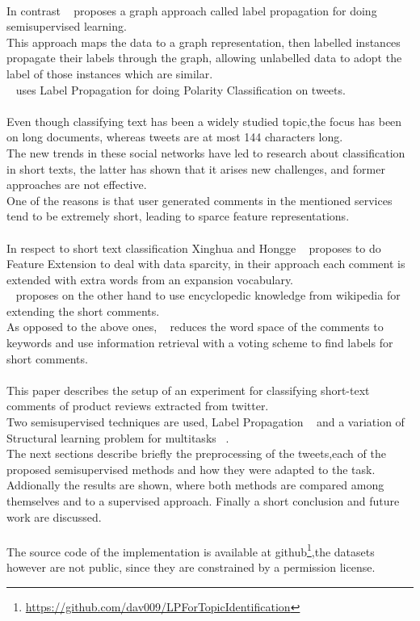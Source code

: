\documentclass[4pt,a4paper,twocolumn]{article}
\begin{document}
\\
In contrast ~\cite{Zhu:2005:SLG:1104523} proposes a graph approach called label propagation for
doing semisupervised learning.\\
This approach maps the data to a graph representation, then labelled instances propagate their labels through the graph, allowing unlabelled data to adopt the label of those instances which are similar.\\
~\cite{Speriosu_twitterpolarity} uses Label Propagation for doing Polarity Classification on tweets.\\
\\
Even though classifying text has been a widely studied topic,the focus has been on long documents,
whereas tweets are at most 144 characters long.\\
The new trends in these social networks have led to research about classification in short texts, the latter has  shown that it arises new challenges, and former approaches are not  effective.\\
One of the reasons is that  user generated comments in the mentioned services tend to be extremely short, leading to sparce feature representations.\\
\\
In respect to short text classification Xinghua and Hongge ~\cite{Fan:2010:NMC:1916732.1917677} proposes  to do Feature Extension to deal with data sparcity, in their approach each comment is extended with extra words from an expansion vocabulary.\\
~\cite{Gabrilovich:2006:OBB:1597348.1597395} proposes on the other hand to use encyclopedic knowledge from wikipedia for extending the short comments.\\
As opposed to the above ones,  ~\cite{Sun:2012:STC:2348283.2348511} reduces the word space of the comments to keywords and use information retrieval with a voting scheme to find labels for short comments.\\
\\
This paper describes the setup of an experiment for classifying short-text comments of product reviews extracted from twitter.\\
Two semisupervised techniques are used, Label Propagation ~\cite{Zhu:2005:SLG:1104523}  and  a variation of Structural learning problem for multitasks ~\cite{Ando:2005:FLP:1046920.1194905}.\\
The next sections describe briefly  the preprocessing of the tweets,each of the proposed semisupervised methods and how they were adapted to the task. \\
Addionally the results are shown, where both methods are compared among themselves and to a supervised approach.
Finally a short conclusion and future work are discussed.\\
\\
The source code of the implementation is available at github\footnote{\url{https://github.com/dav009/LPForTopicIdentification}},the datasets however are not public, since they are constrained by a permission license.
\end{document}
